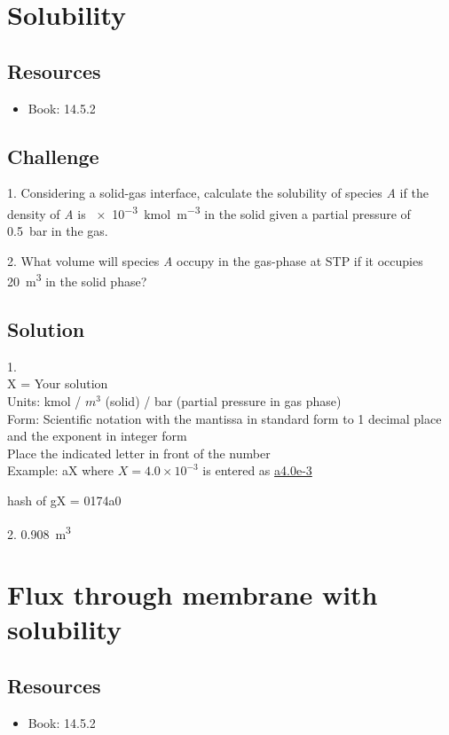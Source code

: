 \iffalse
\newpage
\section{Solubility}

\subsection*{Resources}
\begin{itemize}
    \item Book: 14.5.2
\end{itemize}

\subsection*{Challenge}
1. Considering a solid-gas interface, calculate the solubility of species \emph{A} if the density of \emph{A} is \SI{e-3}{\kmol\per\cubic\meter} in the solid given a partial pressure of \SI{0.5}{\bar} in the gas.

2. What volume will species \emph{A} occupy in the gas-phase at STP if it occupies \SI{20}{\cubic\meter} in the solid phase?

\subsection*{Solution}
1.\\
X = Your solution\\
Units: kmol / $m^3$ (solid) / bar (partial pressure in gas phase)\\
Form: Scientific notation with the mantissa in standard form to 1 decimal place and the exponent in integer form\\
Place the indicated letter in front of the number\\
Example: aX where $X=4.0 \times 10^{-3}$ is entered as \href{http://www.wolframalpha.com/input/?i=md5+hash+of+\%22a4.0e-3\%22}{a4.0e-3}

hash of gX = 0174a0

2. \SI{0.908}{\cubic\meter}




\newpage
\section{Flux through membrane with solubility}

\subsection*{Resources}
\begin{itemize}
    \item Book: 14.5.2
\end{itemize}

